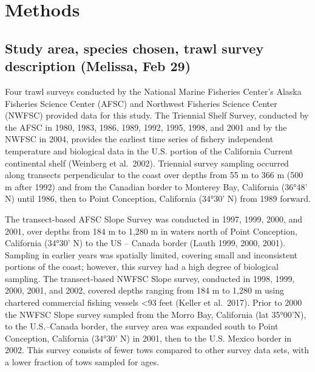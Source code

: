 \documentclass[]{article}
\begin{document}
\hypertarget{methods}{%
\section{Methods}\label{methods}}

\hypertarget{study-area-species-chosen-trawl-survey-description-melissa-feb-29}{%
\subsection{Study area, species chosen, trawl survey description
(Melissa, Feb
29)}\label{study-area-species-chosen-trawl-survey-description-melissa-feb-29}}

Four trawl surveys conducted by the National Marine Fisheries Center's
Alaska Fisheries Science Center (AFSC) and Northwest Fisheries Science
Center (NWFSC) provided data for this study. The Triennial Shelf Survey,
conducted by the AFSC in 1980, 1983, 1986, 1989, 1992, 1995, 1998, and
2001 and by the NWFSC in 2004, provides the earliest time series of
fishery independent temperature and biological data in the U.S. portion
of the California Current continental shelf (Weinberg et al.~2002).
Triennial survey sampling occurred along transects perpendicular to the
coast over depths from 55 m to 366 m (500 m after 1992) and from the
Canadian border to Monterey Bay, California (36°48' N) until 1986, then
to Point Conception, California (34°30' N) from 1989 forward.

The transect-based AFSC Slope Survey was conducted in 1997, 1999, 2000,
and 2001, over depths from 184 m to 1,280 m in waters north of Point
Conception, California (34°30' N) to the US -- Canada border (Lauth
1999, 2000, 2001). Sampling in earlier years was spatially limited,
covering small and inconsistent portions of the coast; however, this
survey had a high degree of biological sampling. The transect-based
NWFSC Slope survey, conducted in 1998, 1999, 2000, 2001, and 2002,
covered depths ranging from 184 m to 1,280 m using chartered commercial
fishing vessels \textless{}93 feet (Keller et al.~2017). Prior to 2000
the NWFSC Slope survey sampled from the Morro Bay, California (lat
35°00'N), to the U.S.--Canada border, the survey area was expanded south
to Point Conception, California (34°30' N) in 2001, then to the U.S.
Mexico border in 2002. This survey consists of fewer tows compared to
other survey data sets, with a lower fraction of tows sampled for ages.
\end{document}
